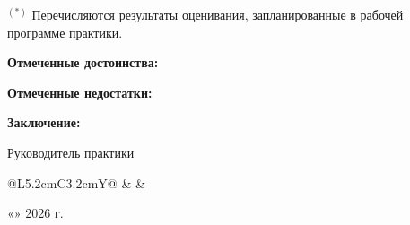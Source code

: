 \vspace{1em}

\noindent\parbox{\textwidth}{$^{(*)}$ Перечисляются результаты оценивания, запланированные в рабочей программе практики.}

\vspace{1.5em}

\noindent\textbf{Отмеченные достоинства:}

\vspace{3.5cm}

\noindent\textbf{Отмеченные недостатки:}

\vspace{3cm}

\noindent\textbf{Заключение:}

\vspace{2.5cm}

\noindent Руководитель практики

\vspace{0.5cm}

\noindent
\begin{tabularx}{\textwidth}{@{}L{5.2cm}C{3.2cm}Y@{}}
\SupervisorRole{} & \underline{\hspace{3cm}} & \SupervisorName
\end{tabularx}

\vspace{1.5cm}

\noindent «\underline{\hspace{0.8cm}}» \underline{\hspace{3cm}} 2026 г.
